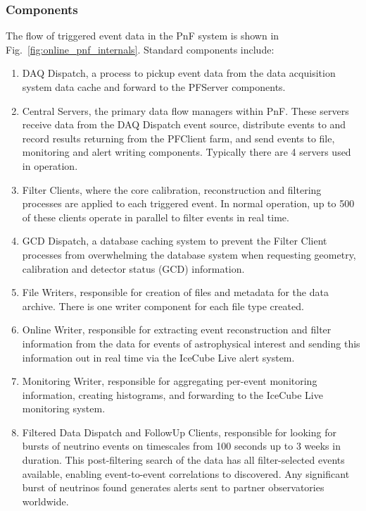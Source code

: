 \subsubsection{Components}

The flow of triggered event data in the PnF
system is shown in Fig.~\ref{fig:online_pnf_internals}.  Standard
components include: 
\begin{enumerate}
\item DAQ Dispatch, a process to pickup event data from the data
  acquisition system data cache and forward to the PFServer components.
\item Central Servers, the primary data flow managers within PnF.  These
  servers receive data from the 
  DAQ Dispatch event source, distribute events to and record results
  returning from the PFClient farm, and send events to file, monitoring and
  alert writing components.  Typically there are 4 servers used in
  operation.
\item Filter Clients, where the core calibration, reconstruction and
  filtering processes are applied to each triggered event.  In normal
  operation, up to 500 of these clients operate in parallel to filter
  events in real time.
\item GCD Dispatch, a database caching system to prevent the
  Filter Client processes from overwhelming the database system when requesting
  geometry, calibration and detector status (GCD) information.  
\item File Writers, responsible for creation of files and metadata for
  the data archive.  There is one writer component for each file type created.
\item Online Writer, responsible for extracting event reconstruction and
  filter information from the data for events of astrophysical interest and
  sending this information out in real time via the IceCube Live alert
  system.
\item Monitoring Writer, responsible for aggregating per-event monitoring
  information, creating histograms, and forwarding to the IceCube Live
  monitoring system.
\item Filtered Data Dispatch and FollowUp Clients, responsible for
  looking for bursts of neutrino events on timescales from 100 seconds up
  to 3 weeks in duration. This post-filtering search of the data has all
  filter-selected events available, enabling event-to-event correlations to
  discovered.  Any significant burst of neutrinos found generates alerts
  sent to partner observatories worldwide.
\end{enumerate}

